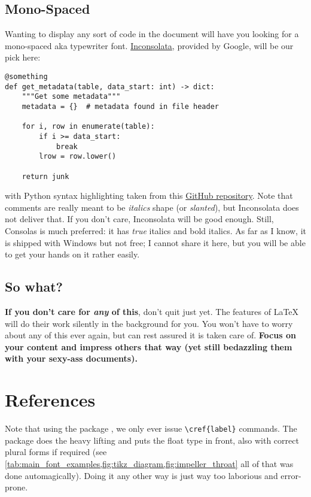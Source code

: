 \subsection{Mono-Spaced}\label{ch:mono-spaced}
Wanting to display any sort of code in the document will have you looking for a mono-spaced aka typewriter font.
\href{https://fonts.google.com/specimen/Inconsolata }{Inconsolata}, provided by Google, will be our pick here:
\begin{lstlisting}[style=betweenpar]
@something
def get_metadata(table, data_start: int) -> dict:
	"""Get some metadata"""
	metadata = {}  # metadata found in file header

	for i, row in enumerate(table):
		if i >= data_start:
			break
		lrow = row.lower()

	return junk
\end{lstlisting}
with Python syntax highlighting taken from this \href{https://github.com/olivierverdier/python-latex-highlighting}{GitHub repository}.
Note that comments are really meant to be \textit{italics} shape (or \textsl{slanted}), but Inconsolata does not deliver that.
If you don't care, Inconsolata will be good enough.
Still, Consolas is much preferred: it has \emph{true} italics and bold italics.
As far as I know, it is shipped with Windows but not free; I cannot share it here, but you will be able to get your hands on it rather easily.

\subsection*{So what?}
\textbf{If you don't care for \textit{any} of this}, don't quit just yet.
The features of \LaTeX{} will do their work silently in the background for you.
You won't have to worry about any of this ever again, but can rest assured it is taken care of.
\textbf{Focus on your content and impress others that way (yet still bedazzling them with your sexy-ass documents).}
\section{References}
Note that using the package , we only ever issue \verb|\cref{label}| commands.
The package does the heavy lifting and puts the float type in front, also with correct plural forms if required (see \cref{tab:main_font_examples,fig:tikz_diagram,fig:impeller_throat} \textleftarrow{} all of that was done automagically).
Doing it any other way is just way too laborious and error-prone.

